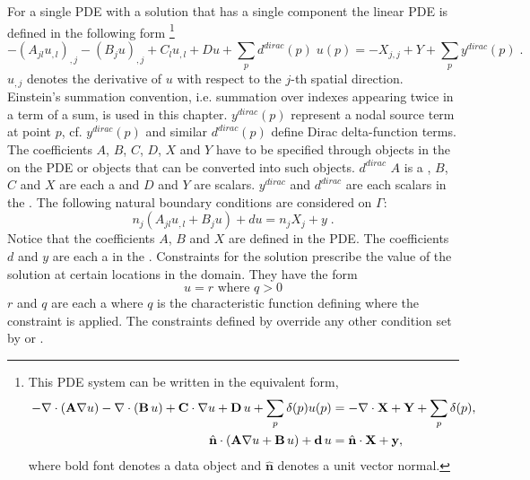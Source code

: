 For a single PDE with a solution that has a single component the linear PDE is
defined in the following form \footnote{This PDE system can be written in the equivalent form, \begin{align*} \centering \, -\nabla \cdot \left( \textbf{A} \nabla u \right) - \nabla \cdot \left( \textbf{B} \, u \right) + \textbf{C} \cdot \nabla u + \textbf{D} \, u + \sum_p \delta(p) u(p) &= - \nabla \cdot \textbf{X} + \textbf{Y} + \sum_p \delta(p), \\
	\hat{\textbf{n}} \cdot \left( \textbf{A} \nabla u + \textbf{B} \, u \right) + \textbf{d} \, u &= \hat{\textbf{n}} \cdot \textbf{X} + \textbf{y}, 
\end{align*} where bold font denotes a data object and $\hat{\textbf{n}}$ denotes a unit vector normal.} 
\begin{equation}\label{LINEARPDE.SINGLE.1}
-(A_{jl} u_{,l})_{,j}-(B_{j} u)_{,j}+C_{l} u_{,l}+D u + \sum_p d^{dirac}(p) \; u(p) =-X_{j,j}+Y + \sum_p y^{dirac}(p)  \; .
\end{equation}
$u_{,j}$ denotes the derivative of $u$ with respect to the $j$-th spatial direction.
Einstein's summation convention, i.e. summation over indexes appearing twice
in a term of a sum, is used in this chapter. $y^{dirac}(p)$ represent a nodal source term 
at point $p$, cf. $y^{dirac}(p) $ and similar $d^{dirac}(p)$ define Dirac delta-function 
terms. 
The coefficients $A$, $B$, $C$, $D$, $X$ and $Y$ have to be specified through
\Data objects in the \Function on the PDE or objects that can be converted
into such \Data objects. $d^{dirac}$
$A$ is a \RankTwo, $B$, $C$ and $X$ are each a \RankOne and $D$ and $Y$ are
scalars. $y^{dirac}$ and $d^{dirac}$ are each scalars in the \DiracDeltaFunctions. 
The following natural boundary conditions are considered on $\Gamma$: 
\begin{equation}\label{LINEARPDE.SINGLE.2}
n_{j}(A_{jl} u_{,l}+B_{j} u)+d u=n_{j}X_{j} + y  \;.
\end{equation}
Notice that the coefficients $A$, $B$ and $X$ are defined in the PDE.
The coefficients $d$ and $y$ are each a \Scalar in the \FunctionOnBoundary.
Constraints for the solution prescribe the value of the
solution at certain locations in the domain. They have the form
\begin{equation}\label{LINEARPDE.SINGLE.3}
u=r \mbox{ where } q>0
\end{equation}
$r$ and $q$ are each a \Scalar where $q$ is the characteristic function
defining where the constraint is applied.
The constraints defined by  override any other
condition set by  or .


